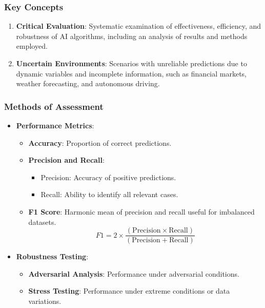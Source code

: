 \documentclass[aspectratio=169]{beamer}
\begin{document}
\begin{frame}[fragile]
    \frametitle{Key Concepts}
    \begin{enumerate}
        \item \textbf{Critical Evaluation}: Systematic examination of effectiveness, efficiency, and robustness of AI algorithms, including an analysis of results and methods employed.
        
        \item \textbf{Uncertain Environments}: Scenarios with unreliable predictions due to dynamic variables and incomplete information, such as financial markets, weather forecasting, and autonomous driving.
    \end{enumerate}
\end{frame}

\begin{frame}[fragile]
    \frametitle{Methods of Assessment}
    \begin{itemize}
        \item \textbf{Performance Metrics}:
            \begin{itemize}
                \item \textbf{Accuracy}: Proportion of correct predictions.
                \item \textbf{Precision and Recall}:
                    \begin{itemize}
                        \item Precision: Accuracy of positive predictions.
                        \item Recall: Ability to identify all relevant cases.
                    \end{itemize}
                \item \textbf{F1 Score}: Harmonic mean of precision and recall useful for imbalanced datasets.
                \begin{equation}
                    F1 = 2 \times \frac{(\text{Precision} \times \text{Recall})}{(\text{Precision} + \text{Recall})}
                \end{equation}
            \end{itemize}
            
        \item \textbf{Robustness Testing}:
            \begin{itemize}
                \item \textbf{Adversarial Analysis}: Performance under adversarial conditions.
                \item \textbf{Stress Testing}: Performance under extreme conditions or data variations.
            \end{itemize}
    \end{itemize}
\end{frame}
\end{document}
